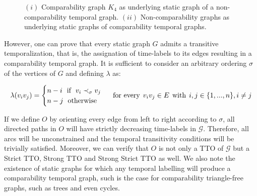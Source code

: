 \documentclass[runningheads]{llncs}
\begin{document}
\begin{figure}[H]
\begin{center}
    \end{center}
    \caption{$(i)$ Comparability graph $K_4$ as underlying static graph of a non-comparability temporal graph. $(ii)$ Non-comparability graphs as underlying static graphs of comparability temporal graphs.}
    \label{fig:t-comparability-examples}
\end{figure}

However, one can prove that every static graph $G$ admits a transitive temporalization, that is, the assignation of time-labels to its edges resulting in a comparability temporal graph. It is sufficient to consider an arbitrary ordering $\sigma$ of the vertices of $G$ and defining $\lambda$ as:

$$
\lambda(v_{i}v_{j})=
\begin{cases}
n-i \hspace{1.5ex} \text{if} \hspace{1.5ex} v_{i} \prec_{\sigma} v_{j}\\
n-j \hspace{1.5ex} \text{otherwise}
\end{cases}
\hspace{1ex} \text{for every} \hspace{1ex} v_{i}v_{j} \in E \hspace{1ex} \text{with} \hspace{1ex} i,j \in \{1, ..., n \}, i \neq j
$$

If we define $O$ by orienting every edge from left to right according to $\sigma$, all directed paths in $O$ will have strictly decreasing time-labels in $\mathcal{G}$. Therefore, all arcs will be unconstrained and the temporal transitivity conditions will be trivially satisfied. Moreover, we can verify that $O$ is not only a TTO of $\mathcal{G}$ but a Strict TTO, Strong TTO and Strong Strict TTO as well. We also note the existence of static graphs for which any temporal labelling will produce a comparability temporal graph, such is the case for comparability triangle-free graphs, such as trees and even cycles.
\end{document}
